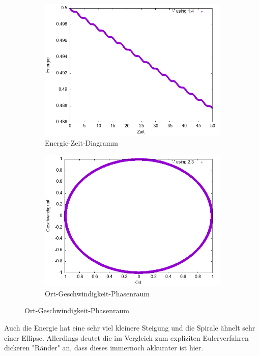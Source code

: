 \documentclass[
    oneside,
    ngerman,
    footinclude=false,
    captions=tableheading,
    DIV=12
]{scrartcl}
\begin{document}
            \begin{figure}[H]
            \centering
            \begin{subfigure}[b]{0.45\textwidth}
                \centering
                \includegraphics[width=\textwidth]{Bilddateien/LLA1(a)-0001-E.png}
                \caption{Energie-Zeit-Diagramm}
                \label{fig:LLA1(a)-0001-0-E}
            \end{subfigure}
            \hfill
            \begin{subfigure}[b]{0.45\textwidth}
                \centering
                \includegraphics[width=\textwidth]{Bilddateien/LLA1(a)-0001-0-xv.png}
                \caption{Ort-Geschwindigkeit-Phasenraum}
                \label{fig:LLA1(a)-0001-0-xv}
            \end{subfigure}
            \end{figure}
            Auch die Energie hat eine sehr viel kleinere Steigung und die Spirale ähnelt sehr einer Ellipse. Allerdings deutet die im Vergleich zum expliziten Eulerverfahren dickeren "Ränder" an, dass dieses immernoch akkurater ist hier.
            \newpage
\end{document}
